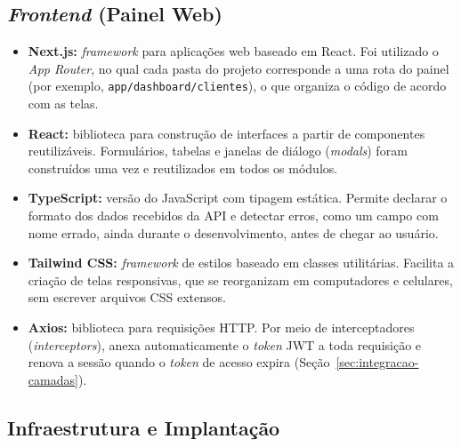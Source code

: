 \subsection{\textit{Frontend} (Painel Web)}

\begin{itemize}
\item \textbf{Next.js:} \textit{framework} para aplicações web baseado em React. Foi utilizado o \textit{App Router}, no qual cada pasta do projeto corresponde a uma rota do painel (por exemplo, \texttt{app/\allowbreak{}dashboard/\allowbreak{}clientes}), o que organiza o código de acordo com as telas.
\item \textbf{React:} biblioteca para construção de interfaces a partir de componentes reutilizáveis. Formulários, tabelas e janelas de diálogo (\textit{modals}) foram construídos uma vez e reutilizados em todos os módulos.
\item \textbf{TypeScript:} versão do JavaScript com tipagem estática. Permite declarar o formato dos dados recebidos da API e detectar erros, como um campo com nome errado, ainda durante o desenvolvimento, antes de chegar ao usuário.
\item \textbf{Tailwind CSS:} \textit{framework} de estilos baseado em classes utilitárias. Facilita a criação de telas responsivas, que se reorganizam em computadores e celulares, sem escrever arquivos CSS extensos.
\item \textbf{Axios:} biblioteca para requisições HTTP. Por meio de interceptadores (\textit{interceptors}), anexa automaticamente o \textit{token} JWT a toda requisição e renova a sessão quando o \textit{token} de acesso expira (Seção~\ref{sec:integracao-camadas}).
\end{itemize}

\subsection{Infraestrutura e Implantação}

